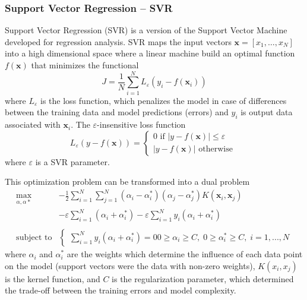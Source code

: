 \documentclass[a4paper,12pt, english]{article}
\newcommand{\x}{\mathbf{x}}
\begin{document}
\subsubsection{ Support Vector Regression -- SVR}

Support Vector Regression (SVR) is a  version of the Support Vector Machine  developed for regression analysis.  SVR  maps the input vectors $\x=[x_1, \dots, x_N]$ into a high dimensional  space where a linear machine build an optimal  function $f(\x)$
that minimizes the  functional \cite{were:2015}
$$
J = \frac{1}{N} \sum_{i=1}^{N} L_{\varepsilon} ( y_i - f(\x_i) ) 
$$
where
$ L_{\varepsilon}$ is the loss function, which penalizes the model in case of differences between the training data and model predictions (errors) and
$y_i$ is output data associated with $\x_i$.
The  $\varepsilon$-insensitive loss function \cite{gunn:1998} 
\[
L_{\varepsilon}(y - f(\x))=
\begin{cases}
  0           \mbox{ if } |y - f(\x)|\le \varepsilon\\
  |y - f(\x)|  \mbox{ otherwise }
\end{cases}
\] 
where $\varepsilon$ is a SVR parameter. 

This optimization problem can be transformed into a dual problem
 \begin{equation}
   \begin{array}{rl}
     \max_{\alpha,  \alpha*}  & -\frac{1}{2}\sum_{i=1}^{N}\sum_{j=1}^{N} 
                                (\alpha_i-\alpha_i^*)(\alpha_j-\alpha_j^*)K(\x_i,\x_j)\\
                             ~& -\varepsilon  \sum_{i=1}^{N} (\alpha_i+\alpha_i^*)
                                -\varepsilon  \sum_{i=1}^{N} y_i(\alpha_i+\alpha_i^*)
                                \\\\
     \mbox{subject to}        &
                               \begin{cases} 
                                 \sum_{i=1}^{N} y_i(\alpha_i+\alpha_i^*)=0 
                                 0\ge\alpha_i\ge C,\; 0\ge\alpha_i^*\ge C, \; i=1, ..., N
                               \end{cases}
   \end{array}
   \label{eq:svr-04}
 \end{equation}
where $\alpha_i$ and $\alpha_i^*$ are the weights  which determine the influence of each data point on the model (support vectors were the data with non-zero weights), $K(x_i, x_j)$ is the kernel function, and $C$ is the regularization parameter, which determined the trade-off between the training errors and model complexity.
\end{document}
